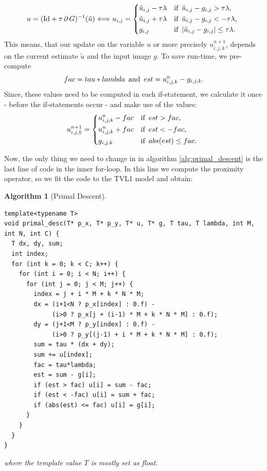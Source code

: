 \documentclass{scrreprt}
\newtheorem{algorithm}[theorem]{Algorithm}
\begin{document}
            $$
                u = (\textnormal{Id} + \tau\,\partial\,G)^{-1}(\tilde{u}) \Longleftrightarrow u_{i, j} = 
                    \begin{dcases*}
                        \tilde{u}_{i,j} - \tau\lambda & \textnormal{if\, $\tilde{u}_{i,j} - g_{i,j} > \tau\lambda$,} \\
                        \tilde{u}_{i,j} + \tau\lambda & \textnormal{if\, $\tilde{u}_{i,j} - g_{i,j} < - \tau\lambda$,} \\
                        g_{i, j} & \textnormal{if\, $|\tilde{u}_{i,j} - g_{i,j}| \le \tau\lambda$}.
                    \end{dcases*}
            $$
        This means, that our update on the variable $u$ or more precisely $u^{n+1}_{i,j,k}$, depends on the current estimate $\tilde{u}$ and the input image $g$. To save run-time, we pre-compute
            $$
                fac = tau*lambda \,\,\, \textnormal{and} \,\,\, est = u^{n}_{i,j,k} - g_{i,j,k}.
            $$
        Since, these values need to be computed in each if-statement, we calculate it once - before the if-statements occur - and make use of the values:
            $$
                u^{n+1}_{i,j,k} = 
                    \begin{dcases*}
                        u^{n}_{i,j,k} - fac & \textnormal{if\, $est > fac$,} \\
                        u^{n}_{i,j,k} + fac & \textnormal{if\, $est < - fac$,} \\
                        g_{i,j,k} & \textnormal{if\, $abs(est) \le fac$}.
                    \end{dcases*}
            $$

        Now, the only thing we need to change in in algorithm \ref{alg:primal_descent} is the last line of code in the inner for-loop. In this line we compute the proximity operator, so we fit the code to the TVL1 model and obtain:

            \begin{algorithm}[Primal Descent]
                \begin{lstlisting}
template<typename T>
void primal_desc(T* p_x, T* p_y, T* u, T* g, T tau, T lambda, int M, int N, int C) {
  T dx, dy, sum;
  int index;
  for (int k = 0; k < C; k++) {
    for (int i = 0; i < N; i++) {
      for (int j = 0; j < M; j++) {
        index = j + i * M + k * N * M;
        dx = (i+1<N ? p_x[index] : 0.f) -
             (i>0 ? p_x[j + (i-1) * M + k * N * M] : 0.f);
        dy = (j+1<M ? p_y[index] : 0.f) -
             (i>0 ? p_y[(j-1) + i * M + k * N * M] : 0.f);
        sum = tau * (dx + dy);
        sum += u[index];
        fac = tau*lambda;
        est = sum - g[i];
        if (est > fac) u[i] = sum - fac;
        if (est < -fac) u[i] = sum + fac;
        if (abs(est) <= fac) u[i] = g[i];
      }
    }
  }
}
                \end{lstlisting}
                where the template value $T$ is mostly set as float.
            \end{algorithm}
\end{document}
